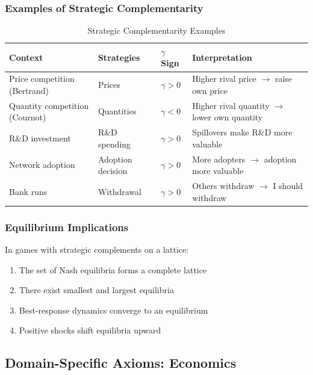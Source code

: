 \subsubsection{Examples of Strategic Complementarity}

\begin{table}[h]
\centering
\caption{Strategic Complementarity Examples}
\label{tab:strategic-gamma}
\renewcommand{\arraystretch}{1.3}
\small
\begin{tabular}{@{}p{3cm}p{3cm}p{2.5cm}p{3.5cm}@{}}
\toprule
\textbf{Context} & \textbf{Strategies} & \textbf{$\gamma$ Sign} & \textbf{Interpretation} \\
\midrule
Price competition (Bertrand) & Prices & $\gamma > 0$ & Higher rival price $\to$ raise own price \\
Quantity competition (Cournot) & Quantities & $\gamma < 0$ & Higher rival quantity $\to$ lower own quantity \\
R\&D investment & R\&D spending & $\gamma > 0$ & Spillovers make R\&D more valuable \\
Network adoption & Adoption decision & $\gamma > 0$ & More adopters $\to$ adoption more valuable \\
Bank runs & Withdrawal & $\gamma > 0$ & Others withdraw $\to$ I should withdraw \\
\bottomrule
\end{tabular}
\end{table}

\subsubsection{Equilibrium Implications}

\begin{theorem}
In games with strategic complements on a lattice:
\begin{enumerate}
    \item The set of Nash equilibria forms a complete lattice
    \item There exist smallest and largest equilibria
    \item Best-response dynamics converge to an equilibrium
    \item Positive shocks shift equilibria upward
\end{enumerate}
\end{theorem}

\subsection{Domain-Specific Axioms: Economics}


